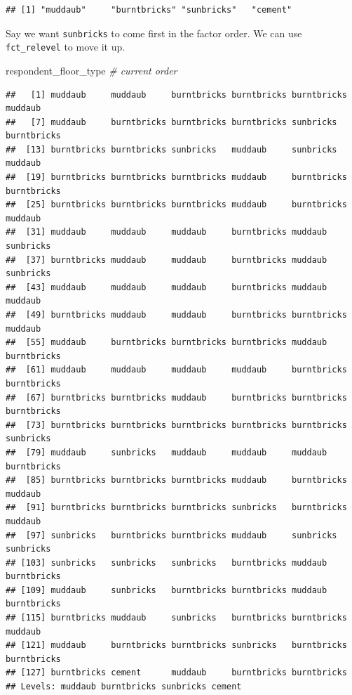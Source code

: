 \documentclass[]{book}
\newenvironment{Shaded}{\begin{snugshade}}{\end{snugshade}}
\newcommand{\CommentTok}[1]{\textcolor[rgb]{0.56,0.35,0.01}{\textit{#1}}}
\newcommand{\NormalTok}[1]{#1}
\begin{document}
\begin{verbatim}
## [1] "muddaub"     "burntbricks" "sunbricks"   "cement"
\end{verbatim}

Say we want \texttt{sunbricks} to come first in the factor order. We can
use \texttt{fct\_relevel} to move it up.

\begin{Shaded}
\begin{Highlighting}[]
\NormalTok{respondent_floor_type }\CommentTok{# current order}
\end{Highlighting}
\end{Shaded}

\begin{verbatim}
##   [1] muddaub     muddaub     burntbricks burntbricks burntbricks muddaub    
##   [7] muddaub     burntbricks burntbricks burntbricks sunbricks   burntbricks
##  [13] burntbricks burntbricks sunbricks   muddaub     sunbricks   muddaub    
##  [19] burntbricks burntbricks burntbricks muddaub     burntbricks burntbricks
##  [25] burntbricks burntbricks burntbricks muddaub     burntbricks muddaub    
##  [31] muddaub     muddaub     muddaub     burntbricks muddaub     sunbricks  
##  [37] burntbricks muddaub     muddaub     burntbricks muddaub     sunbricks  
##  [43] muddaub     muddaub     muddaub     burntbricks muddaub     muddaub    
##  [49] burntbricks muddaub     muddaub     burntbricks burntbricks muddaub    
##  [55] muddaub     burntbricks burntbricks burntbricks muddaub     burntbricks
##  [61] muddaub     muddaub     muddaub     muddaub     burntbricks burntbricks
##  [67] burntbricks burntbricks muddaub     burntbricks burntbricks burntbricks
##  [73] burntbricks burntbricks burntbricks burntbricks burntbricks sunbricks  
##  [79] muddaub     sunbricks   muddaub     muddaub     muddaub     burntbricks
##  [85] burntbricks burntbricks burntbricks muddaub     burntbricks muddaub    
##  [91] burntbricks burntbricks burntbricks sunbricks   burntbricks muddaub    
##  [97] sunbricks   burntbricks burntbricks muddaub     sunbricks   sunbricks  
## [103] sunbricks   sunbricks   sunbricks   burntbricks muddaub     burntbricks
## [109] muddaub     sunbricks   burntbricks burntbricks muddaub     burntbricks
## [115] burntbricks muddaub     sunbricks   burntbricks burntbricks muddaub    
## [121] muddaub     burntbricks burntbricks sunbricks   burntbricks burntbricks
## [127] burntbricks cement      muddaub     burntbricks burntbricks
## Levels: muddaub burntbricks sunbricks cement
\end{verbatim}
\end{document}
